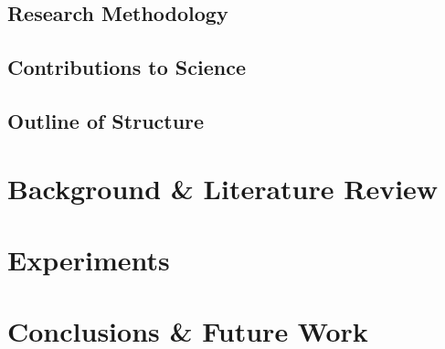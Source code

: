 \documentclass[a4paper, 12pt]{report}
\begin{document}
    \section{Research Methodology}

    \section{Contributions to Science}

    \section{Outline of Structure}


    \newpage
    \chapter{Background \& Literature Review}


    \newpage
    \chapter{Experiments}


    \newpage
    \chapter{Conclusions \& Future Work}


    \newpage
    
\end{document}
